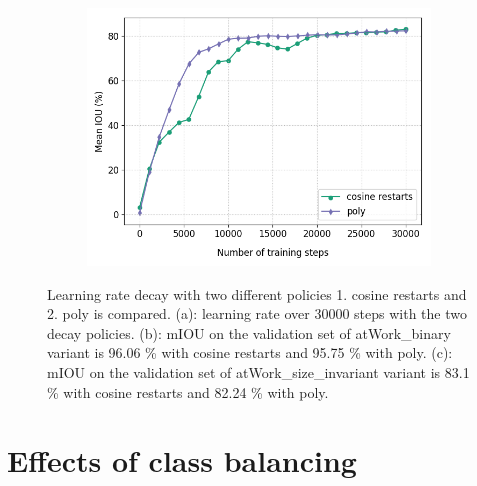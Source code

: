 \begin{figure}
\begin{subfigure}{.3\textwidth}
			\includegraphics[width=1\linewidth]{images/lr_size}
			\caption{}
		\end{subfigure}
		\caption{Learning rate decay with two different policies 1. cosine restarts and 2. poly is compared. (a): learning rate over 30000 steps with the two decay policies. (b): mIOU on the validation set of atWork\_binary variant is 96.06 \% with cosine restarts and 95.75 \% with poly. (c): mIOU on the validation set of atWork\_size\_invariant variant is 83.1 \% with cosine restarts and 82.24 \% with poly.}
		\label{Fig:lr}
	\end{figure}

\section{Effects of class balancing}
\label{section:clsbal}

